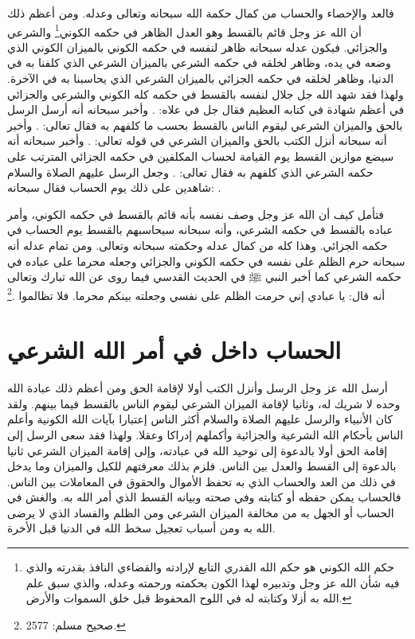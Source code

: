 فالعد والإحصاء والحساب من كمال حكمة الله سبحانه وتعالى وعدله. ومن أعظم ذلك أن الله عز وجل قائم بالقسط وهو العدل الظاهر في حكمه الكوني\footnote{حكم الله الكوني هو حكم الله القدري التابع لإرادته والقضاءي النافذ بقدرته والذي فيه شأن الله عز وجل وتدبيره لهذا الكون بحكمته ورحمته وعدله، والذي سبق علم الله به أزلا وكتابته له في اللوح المحفوظ قبل خلق السموات والأرض.} والشرعي والجزائي. فيكون عدله سبحانه ظاهر لنفسه في حكمه الكوني بالميزان الكوني الذي وضعه في يده، وظاهر لخلقه في حكمه الشرعي بالميزان الشرعي الذي كلفنا به في الدنيا، وظاهر لخلقه في حكمه الجزائي بالميزان الشرعي الذي يحاسبنا به في الآخرة. ولهذا فقد شهد الله جل جلال لنفسه بالقسط في حكمه كله الكوني والشرعي والجزائي في أعظم شهادة في كتابه العظيم فقال جل في علاه: \quranayah*[3][18]{\footnotesize \surahname*[3]}. وأخبر سبحانه أنه أرسل الرسل بالحق والميزان الشرعي ليقوم الناس بالقسط بحسب ما كلفهم به فقال تعالى: \quranayah*[57][25][1-11]{\footnotesize (\surahname*[57])}. وأخبر أنه سبحانه أنزل الكتب بالحق والميزان الشرعي في قوله تعالى: \quranayah*[42][17]{\footnotesize (\surahname*[42])}. وأخبر سبحانه أنه سيضع موازين القسط يوم القيامة لحساب المكلفين في حكمه الجزائي المترتب على حكمه الشرعي الذي كلفهم به فقال تعالى: \quranayah*[21][47]{\footnotesize \surahname*[21]}. وجعل الرسل عليهم الصلاة والسلام شاهدين على ذلك يوم الحساب فقال سبحانه: \quranayah*[10][47]{\footnotesize \surahname*[10]}.

فتأمل كيف أن الله عز وجل وصف نفسه بأنه قائم بالقسط في حكمه الكوني، وأمر عباده بالقسط في حكمه الشرعي، وأنه سبحانه سيحاسبهم بالقسط يوم الحساب في حكمه الجزائي. وهذا كله من كمال عدله وحكمته سبحانه وتعالى. ومن تمام عدله أنه سبحانه حرم الظلم على نفسه في حكمه الكوني والجزائي وجعله محرما على عباده في حكمه الشرعي كما أخبر النبي ﷺ في الحديث القدسي فيما روى عن الله تبارك وتعالى أنه قال: يا عبادي إني حرمت الظلم على نفسي وجعلته بينكم محرما. فلا تظالموا \href{https://shamela.ws/book/1727/6507#p3}{\faExternalLink} \cite{muslim}.\footnote{صحيح مسلم: 2577.}

\section{الحساب داخل في أمر الله الشرعي}

أرسل الله عز وجل الرسل وأنزل الكتب أولا لإقامة الحق ومن أعظم ذلك عبادة الله وحده لا شريك له، وثانيا لإقامة الميزان الشرعي ليقوم الناس بالقسط فيما بينهم. ولقد كان الأنبياء والرسل عليهم الصلاة والسلام أكثر الناس إعتبارا بآيات الله الكونية وأعلم الناس بأحكام الله الشرعية والجزائية وأكملهم إدراكا وعقلا. ولهذا فقد سعى الرسل إلى إقامة الحق أولا بالدعوة إلى توحيد الله في عبادته، وإلى إقامة الميزان الشرعي ثانيا بالدعوة إلى القسط والعدل بين الناس. فلزم بذلك معرفتهم للكيل والميزان وما يدخل في ذلك من العد والحساب الذي به تحفظ الأموال والحقوق في المعاملات بين الناس. فالحساب يمكن حفظه أو كتابته وفي صحته وبيانه القسط الذي أمر الله به. والغش في الحساب أو الجهل به من مخالفة الميزان الشرعي ومن الظلم والفساد الذي لا يرضى الله به ومن أسباب تعجيل سخط الله في الدنيا قبل الأخرة. 

